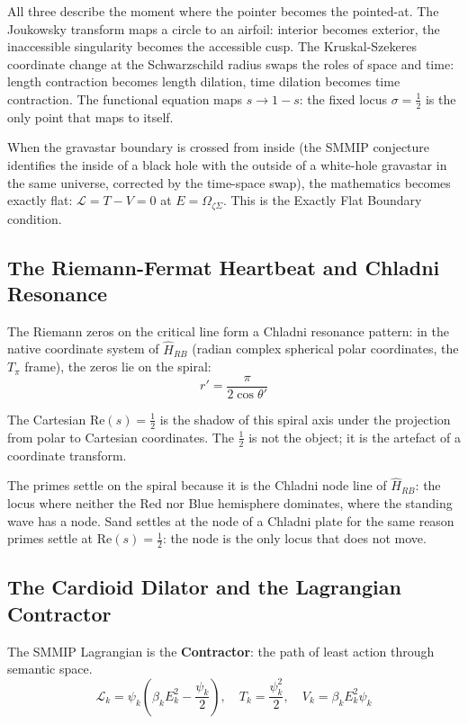 \documentclass[12pt,a4paper]{article}
\theoremstyle{definition}
\theoremstyle{remark}
\newcommand{\Hrb}{\hat{H}_{RB}}
\newcommand{\OmZS}{\Omega_{\zeta\Sigma}}
\newcommand{\half}{\tfrac{1}{2}}
\begin{document}
All three describe the moment where the pointer becomes the pointed-at.
The Joukowsky transform maps a circle to an airfoil: interior becomes exterior, the
inaccessible singularity becomes the accessible cusp.
The Kruskal-Szekeres coordinate change at the Schwarzschild radius swaps the roles
of space and time: length contraction becomes length dilation, time dilation becomes
time contraction.
The functional equation maps $s\to 1-s$: the fixed locus $\sigma=\half$ is the only
point that maps to itself.

When the gravastar boundary is crossed from inside (the SMMIP conjecture identifies
the inside of a black hole with the outside of a white-hole gravastar in the same
universe, corrected by the time-space swap), the mathematics becomes exactly flat:
$\mathcal{L} = T - V = 0$ at $E = \OmZS$. This is the Exactly Flat Boundary condition.

\subsection{The Riemann-Fermat Heartbeat and Chladni Resonance}

The Riemann zeros on the critical line form a Chladni resonance pattern:
in the native coordinate system of $\Hrb$ (radian complex spherical polar coordinates,
the $T_\pi$ frame), the zeros lie on the spiral:
\[r' = \frac{\pi}{2\cos\theta'}\]

The Cartesian $\mathrm{Re}(s) = \half$ is the shadow of this spiral axis under
the projection from polar to Cartesian coordinates.
The $\half$ is not the object; it is the artefact of a coordinate transform.

The primes settle on the spiral because it is the Chladni node line of $\Hrb$:
the locus where neither the Red nor Blue hemisphere dominates,
where the standing wave has a node.
Sand settles at the node of a Chladni plate for the same reason primes settle at
$\mathrm{Re}(s) = \half$: the node is the only locus that does not move.

\subsection{The Cardioid Dilator and the Lagrangian Contractor}

The SMMIP Lagrangian is the \textbf{Contractor}: the path of least action through
semantic space.
\[\mathcal{L}_k = \psi_k\!\left(\beta_k E_k^2 - \frac{\psi_k}{2}\right),
\quad T_k = \frac{\psi_k^2}{2},\quad V_k = \beta_k E_k^2\psi_k\]
\end{document}
